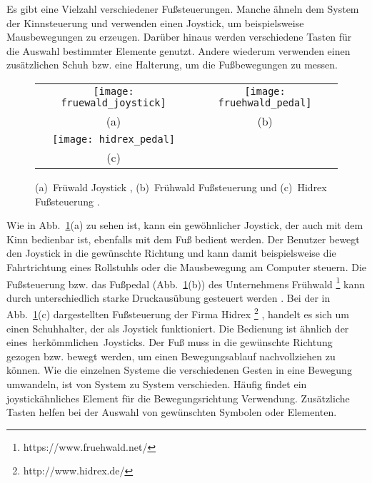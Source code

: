 Es gibt eine Vielzahl verschiedener Fußsteuerungen. Manche ähneln dem System der Kinnsteuerung und verwenden einen Joystick, um beispielsweise Mausbewegungen zu erzeugen. Darüber hinaus werden verschiedene Tasten für die Auswahl bestimmter Elemente genutzt. Andere wiederum verwenden einen zusätzlichen Schuh bzw. eine Halterung, um die Fußbewegungen zu messen.
%
%
\begin{figure}
\centering\small
\setlength{\tabcolsep}{0mm}	%
\begin{tabular}{c@{\hspace{0mm}}c} %
  \texttt{[image: fruewald\_joystick]} &
  \texttt{[image: fruehwald\_pedal]}
\\
  (a) & (b)
\\[7pt]	%
  \texttt{[image: hidrex\_pedal]}
\\
  (c)
\end{tabular}
%
\caption{(a)~Früwald Joystick \cite{FRUEHWALD}, (b)~Frühwald Fußsteuerung \cite{FRUEHWALD} und (c)~Hidrex Fußsteuerung \cite{HIDREX}.}
\label{fig:foot}
\end{figure}
%
%
\newline \newline
Wie in Abb.~\ref{fig:foot}(a) zu sehen ist, kann ein gewöhnlicher Joystick, der auch mit dem Kinn bedienbar ist, ebenfalls mit dem Fuß bedient werden. Der Benutzer bewegt den Joystick in die gewünschte Richtung und kann damit beispielsweise die Fahrtrichtung eines Rollstuhls oder die Mausbewegung am Computer steuern. Die Fußsteuerung bzw. das Fußpedal (Abb.~\ref{fig:foot}(b)) des Unternehmens Frühwald%
\footnote{https://www.fruehwald.net/}
%
kann durch unterschiedlich starke Druckausübung gesteuert werden \cite{FRUEHWALD}. 
\newline \newline 
Bei der in Abb.~\ref{fig:foot}(c) dargestellten Fußsteuerung der Firma Hidrex%
\footnote{http://www.hidrex.de/}%
, handelt es sich um einen Schuhhalter, der als Joystick funktioniert. Die Bedienung ist ähnlich der \mbox{eines herkömmlichen Joysticks}. Der Fuß muss in die gewünschte Richtung gezogen bzw. bewegt werden, um einen Bewegungsablauf nachvollziehen zu können.
%
\newline \newline
Wie die einzelnen Systeme die verschiedenen Gesten in eine Bewegung umwandeln, ist von System zu System verschieden. Häufig findet ein joystickähnliches Element für die Bewegungsrichtung Verwendung. Zusätzliche Tasten helfen bei der Auswahl von gewünschten Symbolen oder Elementen.

